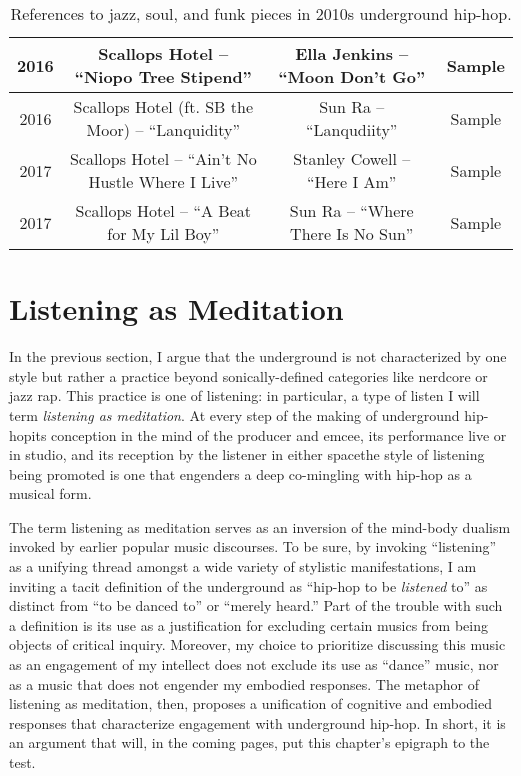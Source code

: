 \begin{sidewaystable}[p]
\begin{tabular}{|c|c|c|c|}
        2016 & Scallops Hotel -- ``Niopo Tree Stipend'' & Ella Jenkins -- ``Moon Don't Go'' & Sample \\ \hline
        2016 & Scallops Hotel (ft. SB the Moor) -- ``Lanquidity'' & Sun Ra -- ``Lanqudiity'' & Sample \\ \hline
        2017 & Scallops Hotel -- ``Ain't No Hustle Where I Live'' & Stanley Cowell -- ``Here I Am'' & Sample \\ \hline
        2017 & Scallops Hotel -- ``A Beat for My Lil Boy'' & Sun Ra -- ``Where There Is No Sun'' & Sample \\ \hline
    \end{tabular}
    \caption{References to jazz, soul, and funk pieces in 2010s underground hip-hop.}
    \label{tab:jazz_references}
\end{sidewaystable}


\newpage
\section{Listening as Meditation}

In the previous section, I argue that the underground is not characterized by one style but rather a
practice beyond sonically-defined categories like nerdcore or jazz rap. This practice is one of
listening: in particular, a type of listen I will term \emph{listening as meditation}. At every
step of the making of underground hip-hop\textemdash its conception in the mind of the producer 
and emcee, its performance live or in studio, and its reception by the listener in either 
space\textemdash the style of listening being promoted is one that engenders a deep co-mingling 
with hip-hop as a musical form.


The term listening as meditation serves as an inversion of the mind-body dualism invoked by 
earlier popular music discourses. To be sure, by invoking ``listening'' as a unifying thread
amongst a wide variety of stylistic manifestations, I am inviting a tacit definition of the
underground as ``hip-hop to be \emph{listened} to'' as distinct from ``to be danced to'' or
``merely heard.'' Part of the trouble with such a definition is its use as a justification 
for excluding certain musics from being objects of critical inquiry. Moreover, my choice 
to prioritize discussing this music as an engagement of my intellect does not exclude its
use as ``dance'' music, nor as a music that does not engender my embodied responses. The
metaphor of listening as meditation, then, proposes a unification of cognitive and embodied
responses that characterize engagement with underground hip-hop. In short, it is an argument
that will, in the coming pages, put this chapter's epigraph to the test.

